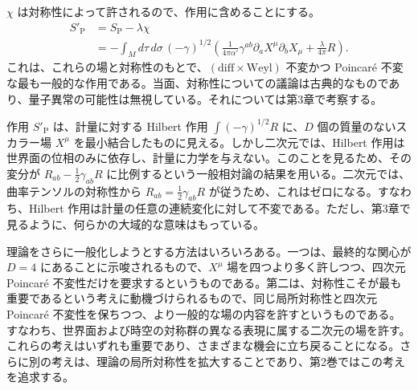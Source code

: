 $\chi$ は対称性によって許されるので、作用に含めることにする。
\begin{equation}
\begin{aligned}
S'_{\mathrm P}&=S_{\mathrm P}-\lambda\chi\\
&=-\int_M d\tau\,d\sigma\,(-\gamma)^{1/2}
\left(\frac{1}{4\pi\alpha'}\gamma^{ab}\partial_aX^\mu\partial_bX_\mu
+\frac{\lambda}{4\pi}R\right).
\end{aligned}
\tag{1.2.33}\label{eq:1.2.33}
\end{equation}
これは、これらの場と対称性のもとで、$(\text{diff}\times\text{Weyl})$ 不変かつ Poincaré 不変な最も一般的な作用である。当面、対称性についての議論は古典的なものであり、量子異常の可能性は無視している。それについては第3章で考察する。

作用 $S'_{\mathrm P}$ は、計量に対する Hilbert 作用 $\int(-\gamma)^{1/2}R$ に、$D$ 個の質量のないスカラー場 $X^\mu$ を最小結合したものに見える。しかし二次元では、Hilbert 作用は世界面の位相のみに依存し、計量に力学を与えない。このことを見るため、その変分が $R_{ab}-\tfrac12\gamma_{ab}R$ に比例するという一般相対論の結果を用いる。二次元では、曲率テンソルの対称性から $R_{ab}=\tfrac12\gamma_{ab}R$ が従うため、これはゼロになる。すなわち、Hilbert 作用は計量の任意の連続変化に対して不変である。ただし、第3章で見るように、何らかの大域的な意味はもっている。

理論をさらに一般化しようとする方法はいろいろある。一つは、最終的な関心が $D=4$ にあることに示唆されるもので、$X^\mu$ 場を四つより多く許しつつ、四次元 Poincaré 不変性だけを要求するというものである。第二は、対称性こそが最も重要であるという考えに動機づけられるもので、同じ局所対称性と四次元 Poincaré 不変性を保ちつつ、より一般的な場の内容を許すというものである。すなわち、世界面および時空の対称群の異なる表現に属する二次元の場を許す。これらの考えはいずれも重要であり、さまざまな機会に立ち戻ることになる。さらに別の考えは、理論の局所対称性を拡大することであり、第2巻ではこの考えを追求する。
